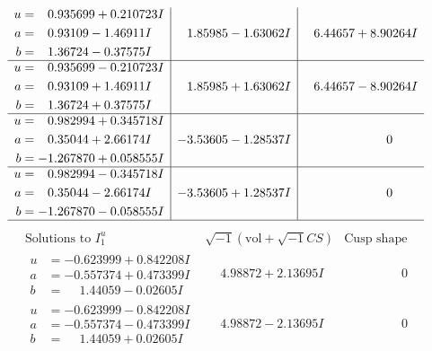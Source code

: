 \documentclass[1p]{elsarticle_modified}
\theoremstyle{definition}
\newcommand{\I}{\sqrt{-1}}
\begin{document}
$$\begin{array}{c|c|c}
\begin{aligned}
u &= \phantom{-}0.935699 + 0.210723 I \\
a &= \phantom{-}0.93109 - 1.46911 I \\
b &= \phantom{-}1.36724 - 0.37575 I\end{aligned}
 & \phantom{-}1.85985 - 1.63062 I & \phantom{-}6.44657 + 8.90264 I \\ \hline\begin{aligned}
u &= \phantom{-}0.935699 - 0.210723 I \\
a &= \phantom{-}0.93109 + 1.46911 I \\
b &= \phantom{-}1.36724 + 0.37575 I\end{aligned}
 & \phantom{-}1.85985 + 1.63062 I & \phantom{-}6.44657 - 8.90264 I \\ \hline\begin{aligned}
u &= \phantom{-}0.982994 + 0.345718 I \\
a &= \phantom{-}0.35044 + 2.66174 I \\
b &= -1.267870 + 0.058555 I\end{aligned}
 & -3.53605 - 1.28537 I & \phantom{-0.000000 } 0 \\ \hline\begin{aligned}
u &= \phantom{-}0.982994 - 0.345718 I \\
a &= \phantom{-}0.35044 - 2.66174 I \\
b &= -1.267870 - 0.058555 I\end{aligned}
 & -3.53605 + 1.28537 I & \phantom{-0.000000 } 0\\
 \hline 
 \end{array}$$\newpage$$\begin{array}{c|c|c}  
\text{Solutions to }I^u_{1}& \I (\text{vol} + \sqrt{-1}CS) & \text{Cusp shape}\\
 \hline 
\begin{aligned}
u &= -0.623999 + 0.842208 I \\
a &= -0.557374 + 0.473399 I \\
b &= \phantom{-}1.44059 - 0.02605 I\end{aligned}
 & \phantom{-}4.98872 + 2.13695 I & \phantom{-0.000000 } 0 \\ \hline\begin{aligned}
u &= -0.623999 - 0.842208 I \\
a &= -0.557374 - 0.473399 I \\
b &= \phantom{-}1.44059 + 0.02605 I\end{aligned}
 & \phantom{-}4.98872 - 2.13695 I & \phantom{-0.000000 } 0 \\ \hline\begin{aligned}

\end{aligned}
\end{array}$$
\end{document}
